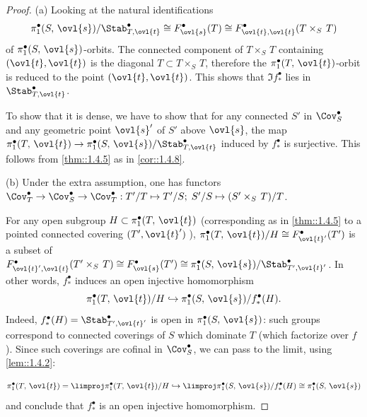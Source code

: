 \begin{proof}
 (a) Looking at the natural identifications 
 \begin{equation*}
 \pi_1^\bullet(S,\,\ovl{s})/\Stab^\bullet_{T,\ovl{t}}\cong
 F^\bullet_{\ovl{s}}(T)\cong F^\bullet_{\ovl{t},\ovl{t}}(T\times_S \,T)
 \end{equation*}
 of $\pi_1^\bullet(S,\,\ovl{s})$-orbits. The connected component of
 $T\times_S \,T$ containing $(\ovl{t},\ovl{t})$ is the 
 diagonal $T\subset T\times_S \,T$, therefore the
 $\pi_1^\bullet(T,\,\ovl{t})$-orbit is reduced to the point
 $(\ovl{t},\ovl{t})$. This shows that $\Im f^\bullet_\ast$ lies in
 $\Stab^\bullet_{T,\ovl{t}}$.

 To show that it is dense, we have to show that for any connected $S'$ in
 $\Cov^\bullet_S$ and any geometric point $\ovl{s}'$ of $S'$ above
 $\ovl{s}$, the map $\pi_1^\bullet(T,\,\ovl{t})\to
 \pi_1^\bullet(S,\,\ovl{s})/\Stab^\bullet_{T,\ovl{t}}$ induced by
 $f^\bullet_\ast $ is surjective. This follows from \ref{thm::1.4.5} as
 in \ref{cor::1.4.8}.

 (b) Under the extra assumption, one has functors $\Cov^\bullet_T\to
 \Cov^\bullet_S\to \Cov^\bullet_T: T'/T\mapsto T'/S ;\;S'/S\mapsto
 (S'\times_S \,T)/T$.

 \noindent For any open subgroup $H\subset  \pi_1^\bullet(T,\,\ovl{t})$
 (corresponding as in \ref{thm::1.4.5} to a pointed connected covering
 $(T',\ovl{t}')\;$), $\pi_1^\bullet(T,\,\ovl{t})/H\cong
 F^\bullet_{\ovl{t}' }(T' )$ is a subset of $
 F^\bullet_{\ovl{t}',\ovl{t}}(T'\times_S\,T)\cong 
 F^\bullet_{\ovl{s}}(T')\cong
 \pi_1^\bullet(S,\,\ovl{s})/\Stab^\bullet_{T',\ovl{t}'}$.
 In other words, $f^\bullet_\ast $ induces an open injective homomorphism 
 \begin{equation*}
 \pi_1^\bullet(T,\,\ovl{t})/H \hookrightarrow
 \pi_1^\bullet(S,\,\ovl{s})/f^\bullet_\ast(H).
 \end{equation*}
 Indeed, $f^\bullet_\ast(H)=\Stab^\bullet_{T',\ovl{t}'} $ is open in
 $\pi_1^\bullet(S,\,\ovl{s}) $: such groups correspond to connected
 coverings of $S$ which dominate $T$ (\ie which factorize over $f$).
 Since such coverings are cofinal in 
 $\Cov^\bullet_S$, we can pass to the limit, using \ref{lem::1.4.2}: 

 \begin{equation*}
 \pi_1^\bullet(T,\,\ovl{t}) = \limproj \pi_1^\bullet(T,\,\ovl{t})/H
 \hookrightarrow \limproj \pi_1^\bullet(S,\,\ovl{s}) /f^\bullet_\ast(H)
 \cong \pi_1^\bullet(S,\,\ovl{s})
 \end{equation*}
 and conclude that $f^\bullet_\ast$ is an open injective homomorphism.
\end{proof}

